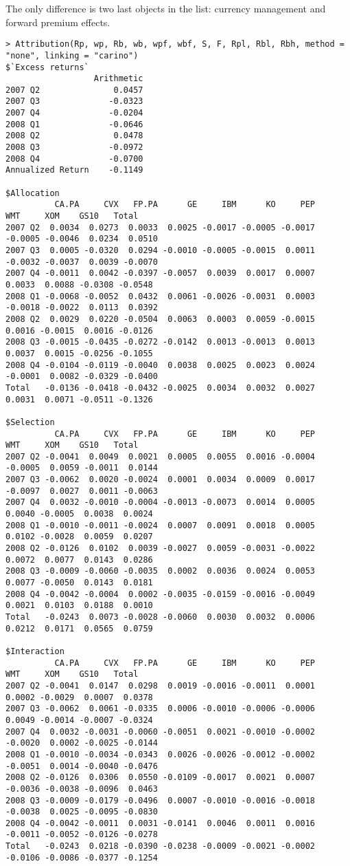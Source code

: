 \documentclass[11pt,a4paper]{article}
\begin{document}
The only difference is two last objects in the list: currency management and forward premium effects.
\begingroup
\fontsize{9pt}{12pt}\selectfont
\begin{verbatim}
> Attribution(Rp, wp, Rb, wb, wpf, wbf, S, F, Rpl, Rbl, Rbh, method = "none", linking = "carino")
$`Excess returns`
                  Arithmetic
2007 Q2               0.0457
2007 Q3              -0.0323
2007 Q4              -0.0204
2008 Q1              -0.0646
2008 Q2               0.0478
2008 Q3              -0.0972
2008 Q4              -0.0700
Annualized Return    -0.1149

$Allocation
          CA.PA     CVX   FP.PA      GE     IBM      KO     PEP     WMT     XOM    GS10   Total
2007 Q2  0.0034  0.0273  0.0033  0.0025 -0.0017 -0.0005 -0.0017 -0.0005 -0.0046  0.0234  0.0510
2007 Q3  0.0005 -0.0320  0.0294 -0.0010 -0.0005 -0.0015  0.0011 -0.0032 -0.0037  0.0039 -0.0070
2007 Q4 -0.0011  0.0042 -0.0397 -0.0057  0.0039  0.0017  0.0007  0.0033  0.0088 -0.0308 -0.0548
2008 Q1 -0.0068 -0.0052  0.0432  0.0061 -0.0026 -0.0031  0.0003 -0.0018 -0.0022  0.0113  0.0392
2008 Q2  0.0029  0.0220 -0.0504  0.0063  0.0003  0.0059 -0.0015  0.0016 -0.0015  0.0016 -0.0126
2008 Q3 -0.0015 -0.0435 -0.0272 -0.0142  0.0013 -0.0013  0.0013  0.0037  0.0015 -0.0256 -0.1055
2008 Q4 -0.0104 -0.0119 -0.0040  0.0038  0.0025  0.0023  0.0024 -0.0001  0.0082 -0.0329 -0.0400
Total   -0.0136 -0.0418 -0.0432 -0.0025  0.0034  0.0032  0.0027  0.0031  0.0071 -0.0511 -0.1326

$Selection
          CA.PA     CVX   FP.PA      GE     IBM      KO     PEP     WMT     XOM    GS10   Total
2007 Q2 -0.0041  0.0049  0.0021  0.0005  0.0055  0.0016 -0.0004 -0.0005  0.0059 -0.0011  0.0144
2007 Q3 -0.0062  0.0020 -0.0024  0.0001  0.0034  0.0009  0.0017 -0.0097  0.0027  0.0011 -0.0063
2007 Q4  0.0032 -0.0010 -0.0004 -0.0013 -0.0073  0.0014  0.0005  0.0040 -0.0005  0.0038  0.0024
2008 Q1 -0.0010 -0.0011 -0.0024  0.0007  0.0091  0.0018  0.0005  0.0102 -0.0028  0.0059  0.0207
2008 Q2 -0.0126  0.0102  0.0039 -0.0027  0.0059 -0.0031 -0.0022  0.0072  0.0077  0.0143  0.0286
2008 Q3 -0.0009 -0.0060 -0.0035  0.0002  0.0036  0.0024  0.0053  0.0077 -0.0050  0.0143  0.0181
2008 Q4 -0.0042 -0.0004  0.0002 -0.0035 -0.0159 -0.0016 -0.0049  0.0021  0.0103  0.0188  0.0010
Total   -0.0243  0.0073 -0.0028 -0.0060  0.0030  0.0032  0.0006  0.0212  0.0171  0.0565  0.0759

$Interaction
          CA.PA     CVX   FP.PA      GE     IBM      KO     PEP     WMT     XOM    GS10   Total
2007 Q2 -0.0041  0.0147  0.0298  0.0019 -0.0016 -0.0011  0.0001  0.0002 -0.0029  0.0007  0.0378
2007 Q3 -0.0062  0.0061 -0.0335  0.0006 -0.0010 -0.0006 -0.0006  0.0049 -0.0014 -0.0007 -0.0324
2007 Q4  0.0032 -0.0031 -0.0060 -0.0051  0.0021 -0.0010 -0.0002 -0.0020  0.0002 -0.0025 -0.0144
2008 Q1 -0.0010 -0.0034 -0.0343  0.0026 -0.0026 -0.0012 -0.0002 -0.0051  0.0014 -0.0040 -0.0476
2008 Q2 -0.0126  0.0306  0.0550 -0.0109 -0.0017  0.0021  0.0007 -0.0036 -0.0038 -0.0096  0.0463
2008 Q3 -0.0009 -0.0179 -0.0496  0.0007 -0.0010 -0.0016 -0.0018 -0.0038  0.0025 -0.0095 -0.0830
2008 Q4 -0.0042 -0.0011  0.0031 -0.0141  0.0046  0.0011  0.0016 -0.0011 -0.0052 -0.0126 -0.0278
Total   -0.0243  0.0218 -0.0390 -0.0238 -0.0009 -0.0021 -0.0002 -0.0106 -0.0086 -0.0377 -0.1254


\end{verbatim}
\end{document}
